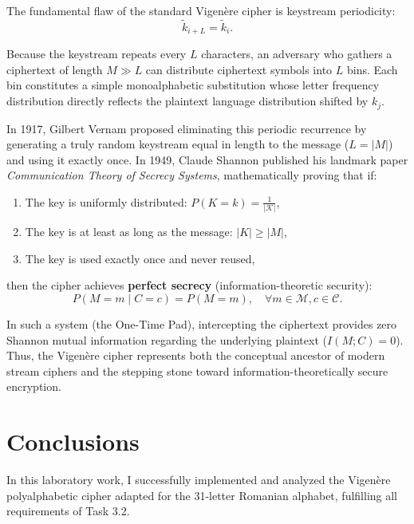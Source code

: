 \documentclass[11pt,a4paper]{article}
\begin{document}
The fundamental flaw of the standard Vigen\`ere cipher is keystream periodicity:
\begin{equation}
  \tilde{k}_{i+L} = \tilde{k}_i.
\end{equation}

Because the keystream repeats every $L$ characters, an adversary who gathers a ciphertext of length $M \gg L$ can distribute ciphertext symbols into $L$ bins. Each bin constitutes a simple monoalphabetic substitution whose letter frequency distribution directly reflects the plaintext language distribution shifted by $k_j$.

In 1917, Gilbert Vernam proposed eliminating this periodic recurrence by generating a truly random keystream equal in length to the message ($L = |M|$) and using it exactly once. In 1949, Claude Shannon published his landmark paper \textit{Communication Theory of Secrecy Systems}, mathematically proving that if:
\begin{enumerate}
  \item The key is uniformly distributed: $P(K = k) = \frac{1}{|\mathcal{K}|}$,
  \item The key is at least as long as the message: $|K| \ge |M|$,
  \item The key is used exactly once and never reused,
\end{enumerate}
then the cipher achieves \textbf{perfect secrecy} (information-theoretic security):
\begin{equation}
  P(M = m \mid C = c) = P(M = m), \quad \forall m \in \mathcal{M}, c \in \mathcal{C}.
\end{equation}

In such a system (the One-Time Pad), intercepting the ciphertext provides zero Shannon mutual information regarding the underlying plaintext ($I(M; C) = 0$). Thus, the Vigen\`ere cipher represents both the conceptual ancestor of modern stream ciphers and the stepping stone toward information-theoretically secure encryption.

\newpage
\section{Conclusions}

In this laboratory work, I successfully implemented and analyzed the Vigen\`ere polyalphabetic cipher adapted for the 31-letter Romanian alphabet, fulfilling all requirements of Task 3.2.
\end{document}
